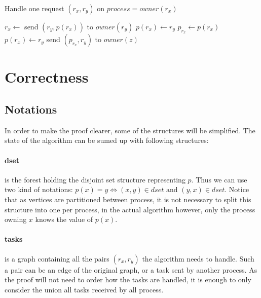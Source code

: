 \documentclass[12px]{article}
\begin{document}
    \begin{algorithm}
      \caption{Handle one request $(r_x, r_y)$ on $process = owner(r_x)$}
      \begin{algorithmic}[1]
          \State $r_x \gets$ 
          \State
            \State send $(r_y, p(r_x))$ to $owner(r_y)$
              \State $p(r_x) \gets r_y$
            \Else
              \State $p_{r_x} \gets p(r_x)$
              \State $p(r_x) \gets r_y$
              \State send $(p_{r_x}, r_y)$ to $owner(z)$
            \EndIf
          \EndIf
        \EndFunction
      \end{algorithmic}
      \label{algo:handle_task}
    \end{algorithm}


  \section{Correctness}

  \subsection{Notations}
    In order to make the proof clearer, some of the structures will be simplified. The state of the algorithm can be sumed up with following structures:

    \paragraph{dset} is the forest holding the disjoint set structure representing $p$. Thus we can use two kind of notations: $p(x) = y \Leftrightarrow (x, y) \in dset \text{ and } (y, x) \in dset$. Notice that as vertices are partitioned between process, it is not necessary to split this structure into one per process, in the actual algorithm however, only the process owning $x$ knows the value of $p(x)$.

    \paragraph{tasks} is a graph containing all the pairs $(r_x, r_y)$ the algorithm needs to handle. Such a pair can be an edge of the original graph, or a task sent by another process. As the proof will not need to order how the tasks are handled, it is enough to only consider the union all tasks received by all process.
\end{document}
